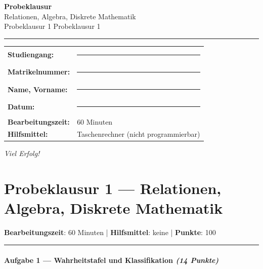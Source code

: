 \documentclass[11pt, a4paper]{article}
\providecommand{\nichttitle}{Probeklausur}
\providecommand{\nichtsubtitle}{}
\renewcommand{\nichttitle}{Relationen, Algebra, Diskrete Mathematik}
\renewcommand{\nichtsubtitle}{Probeklausur 1}
\begin{document}
\thispagestyle{empty}
\begin{center}
\vspace*{1cm}
{\Huge\bfseries\color{accent}Probeklausur}\\[8pt]
{\Large\color{accent}\nichttitle}\\[4pt]
\ifx\nichtsubtitle\empty\else
  {\large\color{accent!80!black}\nichtsubtitle}\\[6pt]
\fi
\color{accent}\rule{0.5\linewidth}{1pt}\color{black}
\end{center}

\vspace{1cm}
\begin{tabularx}{\textwidth}{@{}l X@{}}
\textbf{Studiengang:}      & \rule{6cm}{0.4pt} \\[6pt]
\textbf{Matrikelnummer:}    & \rule{6cm}{0.4pt} \\[6pt]
\textbf{Name, Vorname:}    & \rule{6cm}{0.4pt} \\[6pt]
\textbf{Datum:}             & \rule{6cm}{0.4pt} \\[6pt]
\textbf{Bearbeitungszeit:}  & 60 Minuten \\[6pt]
\textbf{Hilfsmittel:}       & Taschenrechner (nicht programmierbar) \\
\end{tabularx}

\vspace{2cm}
\begin{center}
{\large\itshape Viel Erfolg!}
\end{center}

\newpage


\section{Probeklausur 1 — Relationen, Algebra, Diskrete Mathematik}

\textbf{Bearbeitungszeit}: 60 Minuten | \textbf{Hilfsmittel}: keine | \textbf{Punkte}: 100



\noindent\textcolor{rulegray}{\rule{\linewidth}{0.4pt}}


\paragraph{Aufgabe 1 — Wahrheitstafel und Klassifikation \textit{(14 Punkte)}}\mbox{}\\[2pt]
\end{document}
